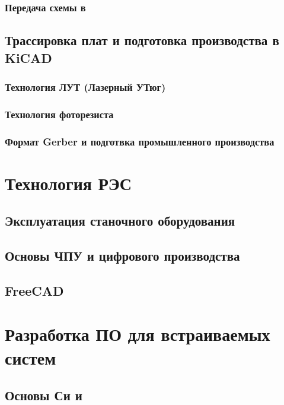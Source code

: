 \section{Передача схемы в \spice}

\chapter{Трассировка плат и подготовка производства в KiCAD}

\section{Технология ЛУТ (Лазерный УТюг)}

\section{Технология фоторезиста}

\section{Формат Gerber и подготвка промышленного производства}

\part{Технология РЭС}

\chapter{Эксплуатация станочного оборудования}

\chapter{Основы ЧПУ и цифрового производства}

\chapter{FreeCAD}

\part{Разработка ПО для встраиваемых систем}

\chapter{Основы Си и \cpp}

